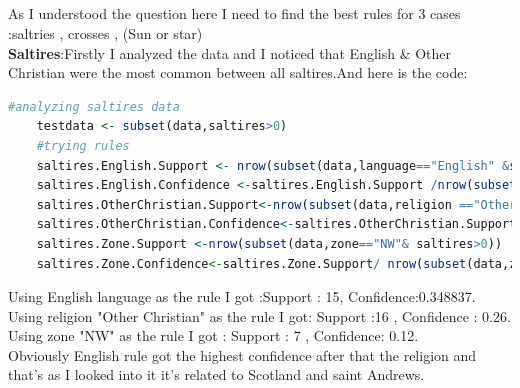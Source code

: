 \documentclass{article}
\begin{document}
	\subsection*{}
	As I understood the question here I need to find the best rules for 3 cases :saltries , crosses , (Sun or star)\\
	\textbf{Saltires}:Firstly I analyzed the data and I noticed that English \& Other Christian were the most common between all saltires.And here is the code:
	\begin{lstlisting}[language=R]
	#analyzing saltires data
	testdata <- subset(data,saltires>0)
	#trying rules
	saltires.English.Support <- nrow(subset(data,language=="English" &saltires>0))
	saltires.English.Confidence <-saltires.English.Support /nrow(subset(data,language=="English" ))
	saltires.OtherChristian.Support<-nrow(subset(data,religion =="Other Christian"&saltires>0))
	saltires.OtherChristian.Confidence<-saltires.OtherChristian.Support/nrow(subset(data,religion=="Other Christian"))
	saltires.Zone.Support <-nrow(subset(data,zone=="NW"& saltires>0))
	saltires.Zone.Confidence<-saltires.Zone.Support/ nrow(subset(data,zone=="NW"))
	\end{lstlisting}
	Using English language as the rule I got :Support : 15, Confidence:0.348837.\\
	Using religion "Other Christian" as the rule I got: Support :16 , Confidence : 0.26.\\
	Using zone "NW" as the rule I got : Support : 7 , Confidence: 0.12.\\
	Obviously English rule got the highest confidence after that the religion and that's as I looked into it it's related to Scotland and saint Andrews.\\
	
\end{document}
